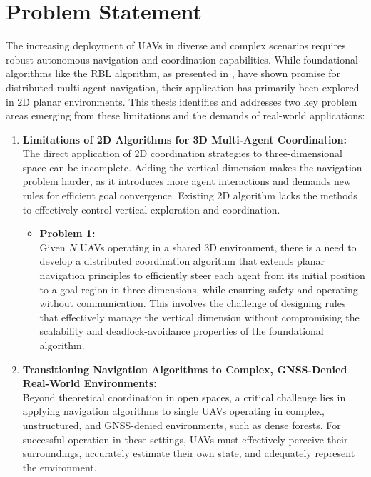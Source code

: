 \section{Problem Statement}
  The increasing deployment of \ac{UAV}s in diverse and complex scenarios requires robust autonomous navigation and coordination capabilities. 
  While foundational algorithms like the \ac{RBL} algorithm, as presented in \cite{rbl_paper}, have shown promise for distributed multi-agent navigation, their application has primarily been explored in 2D planar environments. 
  This thesis identifies and addresses two key problem areas emerging from these limitations and the demands of real-world applications:
  \begin{enumerate}
    \item \textbf{Limitations of 2D Algorithms for 3D Multi-Agent Coordination: } \\
      The direct application of 2D coordination strategies to three-dimensional space can be incomplete. 
      Adding the vertical dimension makes the navigation problem harder, as it introduces more agent interactions and demands new rules for efficient goal convergence.
      Existing 2D algorithm lacks the methods to effectively control vertical exploration and coordination.
      \begin{itemize}
        \item \textbf{Problem 1: } \\
        Given $N$ \ac{UAV}s operating in a shared 3D environment, there is a need to develop a distributed coordination algorithm that extends planar navigation principles to efficiently steer each agent from its initial position to a goal region in three dimensions, while ensuring safety and operating without communication. 
        This involves the challenge of designing rules that effectively manage the vertical dimension without compromising the scalability and deadlock-avoidance properties of the foundational algorithm.
      \end{itemize}
    \item \textbf{Transitioning Navigation Algorithms to Complex, GNSS-Denied Real-World Environments: } \\
      Beyond theoretical coordination in open spaces, a critical challenge lies in applying navigation algorithms to single \ac{UAV}s operating in complex, unstructured, and GNSS-denied environments, such as dense forests. 
      For successful operation in these settings, \ac{UAV}s must effectively perceive their surroundings, accurately estimate their own state, and adequately represent the environment.

\end{enumerate}
